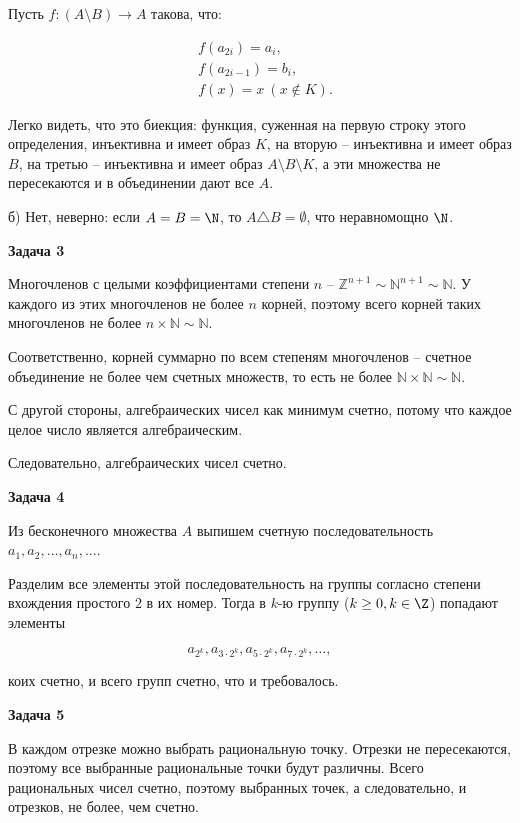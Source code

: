 		Пусть $f: (A \setminus B) \to A$ такова, что:

		\begin{align*}
			& f(a_{2i}) = a_i, \\
			& f(a_{2i-1}) = b_i, \\
			& f(x) = x \ (x \not\in K).
		\end{align*}

		Легко видеть, что это биекция: функция, суженная на первую строку этого определения, инъективна и имеет образ $K$, на вторую -- инъективна и имеет образ $B$, на третью -- инъективна и имеет образ $A \setminus B \setminus K$, а эти множества не пересекаются и в объединении дают все $A$.

		б) Нет, неверно: если $A = B = \N$, то $A \triangle B = \emptyset$, что неравномощно $\N$.


	\begin{center}
    \textbf{Задача 3}
\end{center}
		Многочленов с целыми коэффициентами степени $n$ -- $\mathbb{Z}^{n+1} \sim \mathbb{N}^{n+1} \sim \mathbb{N}$. У каждого из этих многочленов не более $n$ корней, поэтому всего корней таких многочленов не более $n \times \mathbb{N} \sim \mathbb{N}$.

		Соответственно, корней суммарно по всем степеням многочленов -- счетное объединение не более чем счетных множеств, то есть не более $\mathbb{N} \times \mathbb{N} \sim \mathbb{N}$.

		С другой стороны, алгебраических чисел как минимум счетно, потому что каждое целое число является алгебраическим.

		Следовательно, алгебраических чисел счетно.


	\begin{center}
    \textbf{Задача 4}
\end{center}
		Из бесконечного множества $A$ выпишем счетную последовательность $a_1, a_2, \dots, a_n, \dots$.

		Разделим все элементы этой последовательность на группы согласно степени вхождения простого $2$ в их номер. Тогда в $k$-ю группу ($k \ge 0, k \in \Z$) попадают элементы

		\begin{equation*}
			a_{2^k}, a_{3 \cdot 2^k}, a_{5 \cdot 2^k}, a_{7 \cdot 2^k}, \dots,
		\end{equation*}

		коих счетно, и всего групп счетно, что и требовалось.


	\begin{center}
    \textbf{Задача 5}
\end{center}
		В каждом отрезке можно выбрать рациональную точку. Отрезки не пересекаются, поэтому все выбранные рациональные точки будут различны. Всего рациональных чисел счетно, поэтому выбранных точек, а следовательно, и отрезков, не более, чем счетно.


